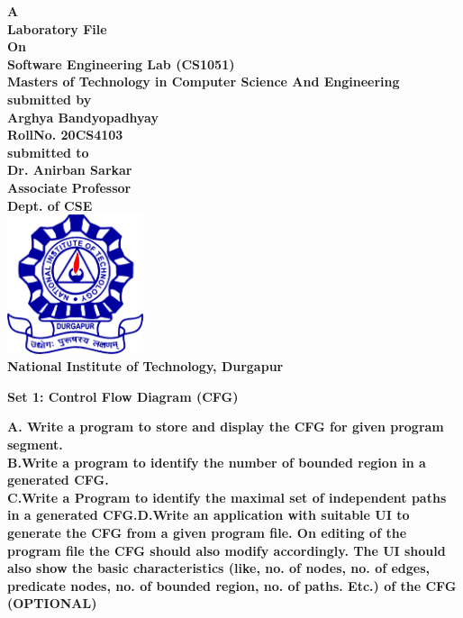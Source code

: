 \documentclass[12pt, letterpaper, twoside]{book}
\date{23rd January 2021}
\begin{document}
\begin{titlepage}
    \centering
    \vfill
    {\bfseries\Large
    	A\\
    	Laboratory File\\
    	On\\
        Software Engineering Lab (CS1051)\\
        \vskip1cm
        Masters of Technology in Computer Science And Engineering\\
        \vskip1cm
        submitted by\\
    	Arghya Bandyopadhyay\\
    	RollNo. 20CS4103\\
    	\vskip1cm
    	submitted to\\
    	Dr. Anirban Sarkar\\
    	Associate Professor\\
    	Dept. of CSE\\
    	\vskip1cm
    	\includegraphics[width=4cm]{NITDGP}\\
    	National Institute of Technology, Durgapur\\
    }
\end{titlepage}
\begin{flushleft}
\begin{large}
\textbf{Set 1: Control Flow Diagram (CFG)}
\end{large}
\end{flushleft}
\begin{flushleft}
\textbf{A. Write a program to store and display the CFG for given program segment.\\
B.Write a program to identify the number of bounded region in a generated CFG.\\
C.Write a Program to identify the maximal set of independent paths in a generated CFG.D.Write an application with suitable UI to generate the CFG  from a given program file. On editing of the program file the CFG should also modify accordingly. The UI should also show the basic characteristics (like, no. of nodes, no. of edges, predicate nodes, no. of bounded region, no. of paths. Etc.) of the CFG (OPTIONAL)}
\end{flushleft}
\end{document}
